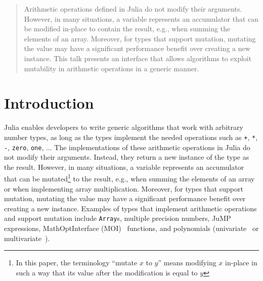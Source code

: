 \documentclass{juliacon}
\begin{document}


\maketitle

\begin{abstract}

Arithmetic operations defined in Julia do not modify their arguments.
However, in many situations, a variable represents an accumulator that can be modified in-place to contain the result, e.g., when summing the elements of an array.
Moreover, for types that support mutation, mutating the value may have a significant performance benefit over creating a new instance.
This talk presents an interface that allows algorithms to exploit mutability in arithmetic operations in a generic manner.

\end{abstract}

\section{Introduction}

Julia enables developers to write generic algorithms that work with arbitrary number types, as long as the types implement the needed operations
such as \lstinline|+|, \lstinline|*|, \lstinline|-|, \lstinline|zero|, \lstinline|one|, ...
The implementations of these arithmetic operations in Julia do not modify their arguments. Instead, they return a new instance of the type as the result.
However, in many situations, a variable represents an accumulator that can be mutated\footnote{\label{foot:mutate}In this paper, the terminology ``mutate $x$ to $y$'' means modifying $x$ in-place in such a way that its value after the modification is equal to $y$} to the result, e.g.,
when summing the elements of an array or when implementing array multiplication.
Moreover, for types that support mutation, mutating the value may have a significant performance benefit over creating a new instance.
Examples of types that implement arithmetic operations and support mutation include \lstinline|Array|s, multiple precision numbers, JuMP~\cite{dunning2017jump} expressions, MathOptInterface (MOI)~\cite{legat2021mathoptinterface} functions, and polynomials (univariate~\cite{verzani2021polynomials} or multivariate~\cite{legat2021multivariatepolynomials}).
\end{document}
